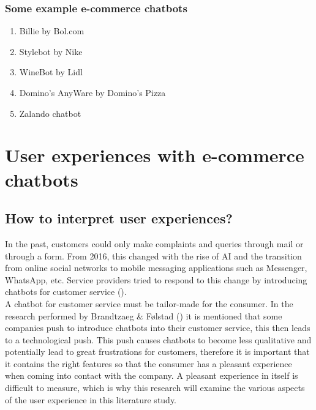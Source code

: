 \subsubsection{Some example e-commerce chatbots}
\begin{enumerate}
	\item Billie by Bol.com
	\item Stylebot by Nike
	\item WineBot by Lidl
	\item Domino's AnyWare by Domino's Pizza
	\item Zalando chatbot
\end{enumerate}

\section{User experiences with e-commerce chatbots}
\subsection{How to interpret user experiences?}
In the past, customers could only make complaints and queries through mail or through a form. From 2016, this changed with the rise of AI and the transition from online social networks to mobile messaging applications such as Messenger, WhatsApp, etc. Service providers tried to respond to this change by introducing chatbots for customer service (\cite{Brandtzaeg2018}).\\
\break
A chatbot for customer service must be tailor-made for the consumer. In the research performed by Brandtzaeg \& Følstad (\cite{Brandtzaeg2018}) it is mentioned that some companies push to introduce chatbots into their customer service, this then leads to a technological push. This push causes chatbots to become less qualitative and potentially lead to great frustrations for customers, therefore it is important that it contains the right features so that the consumer has a pleasant experience when coming into contact with the company. A pleasant experience in itself is difficult to measure, which is why this research will examine the various aspects of the user experience in this literature study.\\

